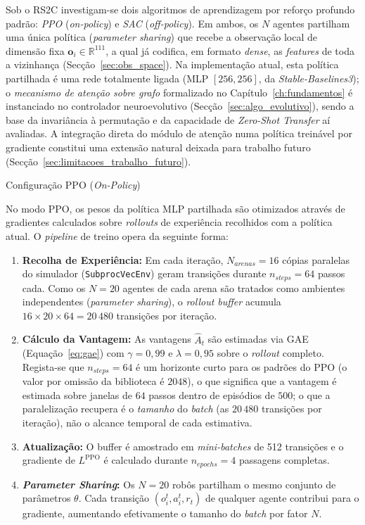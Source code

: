 \documentclass[12pt,reqno, twoside]{amsbook}
\makeatletter
\def\subsection{\@startsection{subsection}{2}%
      \z@{.5\linespacing\@plus.7\linespacing}{.25\linespacing}%
      {\normalfont\bfseries\flushleft}}
\theoremstyle{plain}
\numberwithin{equation}{chapter}
\numberwithin{section}{chapter}
\numberwithin{table}{chapter}
\numberwithin{figure}{chapter}
\makeatother
\begin{document}
Sob o RS2C investigam-se dois algoritmos de aprendizagem por reforço profundo padrão: \emph{PPO} (\textit{on-policy}) e \emph{SAC} (\textit{off-policy}). Em ambos, os $N$ agentes partilham uma única política (\textit{parameter sharing}) que recebe a observação local de dimensão fixa $\mathbf{o}_i \in \mathbb{R}^{111}$, a qual já codifica, em formato \textit{dense}, as \textit{features} de toda a vizinhança (Secção~\ref{sec:obs_space}). Na implementação atual, esta política partilhada é uma rede totalmente ligada (MLP $[256, 256]$, da \textit{Stable-Baselines3}); o \emph{mecanismo de atenção sobre grafo} formalizado no Capítulo~\ref{ch:fundamentos} é instanciado no controlador neuroevolutivo (Secção~\ref{sec:algo_evolutivo}), sendo a base da invariância à permutação e da capacidade de \textit{Zero-Shot Transfer} aí avaliadas. A integração direta do módulo de atenção numa política treinável por gradiente constitui uma extensão natural deixada para trabalho futuro (Secção~\ref{sec:limitacoes_trabalho_futuro}).

\subsection{Configuração PPO (\textit{On-Policy})}

No modo PPO, os pesos da política MLP partilhada são otimizados através de gradientes calculados sobre \textit{rollouts} de experiência recolhidos com a política atual. O \textit{pipeline} de treino opera da seguinte forma:
\begin{enumerate}
    \item \textbf{Recolha de Experiência:} Em cada iteração, $N_{arenas}=16$ cópias paralelas do simulador (\texttt{SubprocVecEnv}) geram transições durante $n_{steps}=64$ passos cada. Como os $N=20$ agentes de cada arena são tratados como ambientes independentes (\textit{parameter sharing}), o \textit{rollout buffer} acumula $16 \times 20 \times 64 = 20\,480$ transições por iteração.
    \item \textbf{Cálculo da Vantagem:} As vantagens $\hat{A}_t$ são estimadas via GAE (Equação~\ref{eq:gae}) com $\gamma=0{,}99$ e $\lambda=0{,}95$ sobre o \textit{rollout} completo. Regista-se que $n_{steps}=64$ é um horizonte curto para os padrões do PPO (o valor por omissão da biblioteca é $2048$), o que significa que a vantagem é estimada sobre janelas de $64$ passos dentro de episódios de $500$; o que a paralelização recupera é o \emph{tamanho} do \textit{batch} (as $20\,480$ transições por iteração), não o alcance temporal de cada estimativa.
    \item \textbf{Atualização:} O buffer é amostrado em \textit{mini-batches} de 512 transições e o gradiente de $L^{\text{PPO}}$ é calculado durante $n_{epochs}=4$ passagens completas.
    \item \textbf{\textit{Parameter Sharing}:} Os $N=20$ robôs partilham o mesmo conjunto de parâmetros $\theta$. Cada transição $(o_i^t, a_i^t, r_t)$ de qualquer agente contribui para o gradiente, aumentando efetivamente o tamanho do \textit{batch} por fator $N$.
\end{enumerate}
\end{document}
